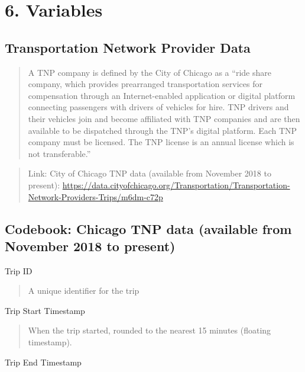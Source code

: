 \documentclass[]{article}
\begin{document}
\hypertarget{variables}{%
\section{6. Variables}\label{variables}}

\hypertarget{transportation-network-provider-data}{%
\subsection{Transportation Network Provider
Data}\label{transportation-network-provider-data}}

\begin{quote}
A TNP company is defined by the City of Chicago as a ``ride share
company, which provides prearranged transportation services for
compensation through an Internet-enabled application or digital platform
connecting passengers with drivers of vehicles for hire. TNP drivers and
their vehicles join and become affiliated with TNP companies and are
then available to be dispatched through the TNP's digital platform. Each
TNP company must be licensed. The TNP license is an annual license which
is not transferable.''
\end{quote}

\begin{quote}
Link: City of Chicago TNP data (available from November 2018 to
present):
\url{https://data.cityofchicago.org/Transportation/Transportation-Network-Providers-Trips/m6dm-c72p}
\end{quote}

\hypertarget{codebook-chicago-tnp-data-available-from-november-2018-to-present}{%
\subsection{Codebook: Chicago TNP data (available from November 2018 to
present)}\label{codebook-chicago-tnp-data-available-from-november-2018-to-present}}

Trip ID

\begin{quote}
A unique identifier for the trip
\end{quote}

Trip Start Timestamp

\begin{quote}
When the trip started, rounded to the nearest 15 minutes (floating
timestamp).
\end{quote}

Trip End Timestamp
\end{document}
